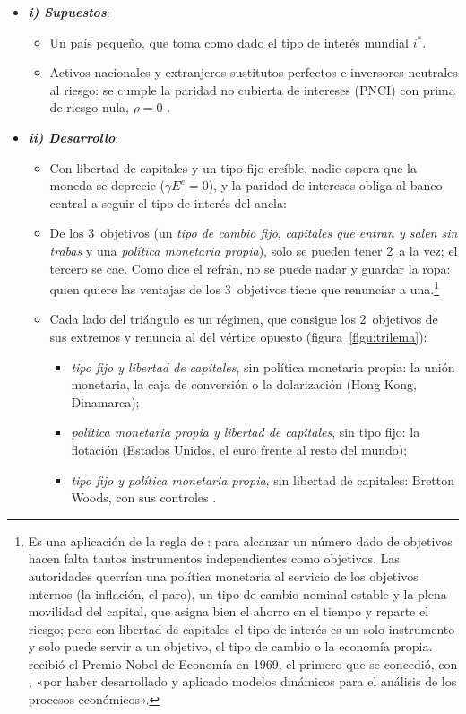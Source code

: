 \documentclass[11pt]{article}
\begin{document}
\begin{itemize}
\item \textbf{\emph{i) Supuestos}}:
  \begin{itemize}
  \item Un país pequeño, que toma como dado el tipo de interés mundial $i^*$.
  \item Activos nacionales y extranjeros sustitutos perfectos e inversores neutrales al riesgo: se cumple la paridad no cubierta de intereses (PNCI) con prima de riesgo nula, $\rho=0$ .
  \end{itemize}
\item \textbf{\emph{ii) Desarrollo}}:
  \begin{itemize}
  \item Con libertad de capitales y un tipo fijo creíble, nadie espera que la moneda se deprecie ($\gamma E^e=0$), y la paridad de intereses obliga al banco central a seguir el tipo de interés del ancla:
  \item De los 3~objetivos (un \emph{tipo de cambio fijo}, \emph{capitales que entran y salen sin trabas} y una \emph{política monetaria propia}), solo se pueden tener 2~a la vez; el tercero se cae\nocite{ObstfeldShambaughTaylor2005}. Como dice el refrán, no se puede nadar y guardar la ropa: quien quiere las ventajas de los 3~objetivos tiene que renunciar a una.\footnote{Es una aplicación de la regla de \textcite{Tinbergen1952Theory}: para alcanzar un número dado de objetivos hacen falta tantos instrumentos independientes como objetivos. Las autoridades querrían una política monetaria al servicio de los objetivos internos (la inflación, el paro), un tipo de cambio nominal estable y la plena movilidad del capital, que asigna bien el ahorro en el tiempo y reparte el riesgo; pero con libertad de capitales el tipo de interés es un solo instrumento y solo puede servir a un objetivo, el tipo de cambio o la economía propia.  recibió el Premio Nobel de Economía en 1969, el primero que se concedió, con , «por haber desarrollado y aplicado modelos dinámicos para el análisis de los procesos económicos»\nocite{Nobel1969}.}
  \item Cada lado del triángulo es un régimen, que consigue los 2~objetivos de sus extremos y renuncia al del vértice opuesto (figura~\ref{figu:trilema}):
    \begin{itemize}
    \item \emph{tipo fijo y libertad de capitales}, sin política monetaria propia: la unión monetaria, la caja de conversión o la dolarización (Hong Kong, Dinamarca);
    \item \emph{política monetaria propia y libertad de capitales}, sin tipo fijo: la flotación (Estados Unidos, el euro frente al resto del mundo);
    \item \emph{tipo fijo y política monetaria propia}, sin libertad de capitales: Bretton Woods, con sus controles .
    \end{itemize}
  \end{itemize}
\end{itemize}
\end{document}
